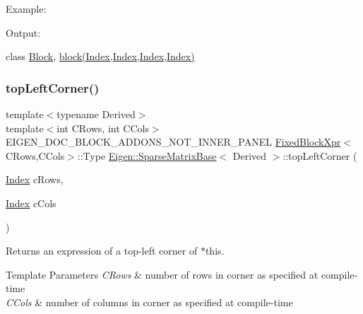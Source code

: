 Example\+: 
\begin{DoxyCodeInclude}{0}
\end{DoxyCodeInclude}
 Output\+: 
\begin{DoxyVerbInclude}
\end{DoxyVerbInclude}
 class \mbox{\hyperlink{class_eigen_1_1_block}{Block}}, \mbox{\hyperlink{class_eigen_1_1_sparse_matrix_base_a7c28a2f511181c727396d5e813519d38}{block(\+Index,\+Index,\+Index,\+Index)}} \mbox{\label{class_eigen_1_1_sparse_matrix_base_a7ca58a7a4a44dcadc519eb67f9611efa}} 
\subsubsection{\texorpdfstring{topLeftCorner()}{topLeftCorner()}\hspace{0.1cm}{\footnotesize\ttfamily [3/3]}}
{\footnotesize\ttfamily template$<$typename Derived$>$ \\
template$<$int C\+Rows, int C\+Cols$>$ \\
E\+I\+G\+E\+N\+\_\+\+D\+O\+C\+\_\+\+B\+L\+O\+C\+K\+\_\+\+A\+D\+D\+O\+N\+S\+\_\+\+N\+O\+T\+\_\+\+I\+N\+N\+E\+R\+\_\+\+P\+A\+N\+EL \mbox{\hyperlink{struct_eigen_1_1_sparse_matrix_base_1_1_fixed_block_xpr}{Fixed\+Block\+Xpr}}$<$C\+Rows,C\+Cols$>$\+::Type \mbox{\hyperlink{class_eigen_1_1_sparse_matrix_base}{Eigen\+::\+Sparse\+Matrix\+Base}}$<$ Derived $>$\+::top\+Left\+Corner (\begin{DoxyParamCaption}\item[{\mbox{\hyperlink{struct_eigen_1_1_eigen_base_a554f30542cc2316add4b1ea0a492ff02}{Index}}}]{c\+Rows,  }\item[{\mbox{\hyperlink{struct_eigen_1_1_eigen_base_a554f30542cc2316add4b1ea0a492ff02}{Index}}}]{c\+Cols }\end{DoxyParamCaption})\hspace{0.3cm}{\ttfamily [inline]}}

\begin{DoxyReturn}{Returns}
an expression of a top-\/left corner of $\ast$this.
\end{DoxyReturn}

\begin{DoxyTemplParams}{Template Parameters}
{\em C\+Rows} & number of rows in corner as specified at compile-\/time \\
\hline
{\em C\+Cols} & number of columns in corner as specified at compile-\/time \\
\hline
\end{DoxyTemplParams}

